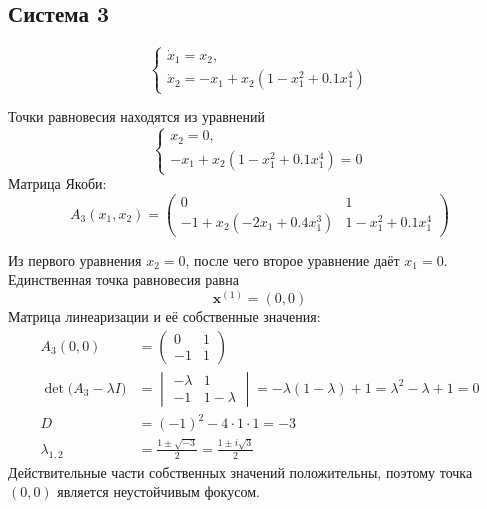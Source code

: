 
\subsection{Система 3}

\begin{equation}
  \begin{cases}
    \dot x_1=x_2,\\
    \dot x_2=-x_1+x_2\left(1-x_1^2+0.1x_1^4\right)
  \end{cases}
  \label{eq:system-3}
\end{equation}

Точки равновесия находятся из уравнений
\begin{equation}
  \begin{cases}
    x_2=0,\\
    -x_1+x_2\left(1-x_1^2+0.1x_1^4\right)=0
  \end{cases}
\end{equation}
Матрица Якоби:
\begin{equation}
  A_3(x_1,x_2)=
  \begin{pmatrix}
    0 & 1\\
    -1+x_2(-2x_1+0.4x_1^3) & 1-x_1^2+0.1x_1^4
  \end{pmatrix}
\end{equation}

Из первого уравнения $x_2=0$, после чего второе уравнение даёт $x_1=0$.
Единственная точка равновесия равна
\begin{equation}
  \bm x^{(1)}=(0,0)
\end{equation}
Матрица линеаризации и её собственные значения:
\begin{equation}
  \begin{aligned}
    A_3(0,0)&=
    \begin{pmatrix}
      0 & 1\\
      -1 & 1
    \end{pmatrix}\\
    \det\bigl(A_3-\lambda I\bigr)
    &=
    \begin{vmatrix}
      -\lambda & 1\\
      -1 & 1-\lambda
    \end{vmatrix}
    =-\lambda(1-\lambda)+1
    =\lambda^2-\lambda+1=0\\
    D&=(-1)^2-4\cdot 1\cdot 1=-3\\
    \lambda_{1,2}
    &=\frac{1\pm\sqrt{-3}}{2}
    =\frac{1\pm i\sqrt{3}}{2}
  \end{aligned}
\end{equation}
Действительные части собственных значений положительны, поэтому точка
$(0,0)$ является неустойчивым фокусом.

